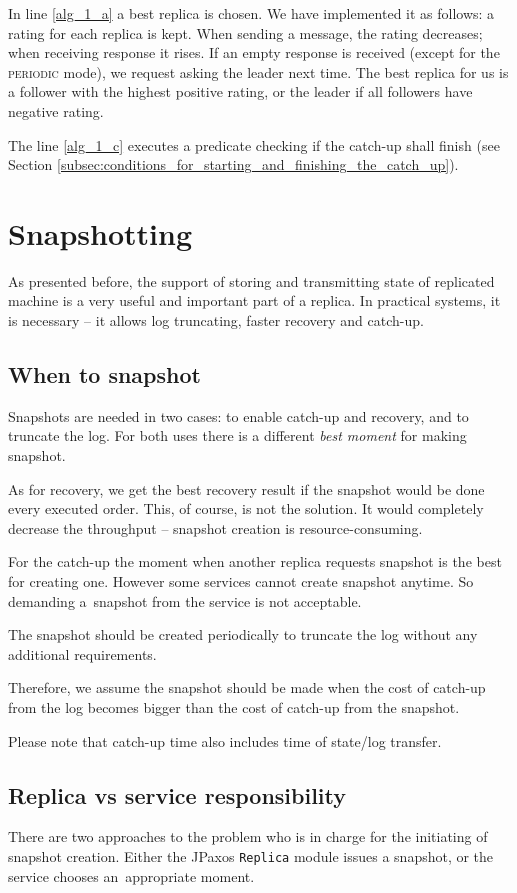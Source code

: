In line \ref{alg_1_a} a best replica is chosen. We have implemented it as follows: a rating for each replica is kept. When sending a message, the rating decreases; when receiving response it rises. If an empty response is received (except for the \textsc{periodic} mode), we request asking the leader next time. The best replica for us is a follower with the highest positive rating, or the leader if all followers have negative rating.

The line \ref{alg_1_c} executes a predicate checking if the catch-up shall finish (see Section \ref{subsec:conditions_for_starting_and_finishing_the_catch_up}).

\section{Snapshotting}
\label{sec:snapshotting}
As presented before, the support of storing and transmitting state of replicated machine is a very useful and important part of a replica. In practical systems, it is necessary -- it allows log truncating, faster recovery and catch-up.

\subsection{When to snapshot}
\label{subsec:when_to_snapshot}
Snapshots are needed in two cases: to enable catch-up and recovery, and to truncate the log. For both uses there is a different \textit{best moment} for making snapshot.

As for recovery, we get the best recovery result if the snapshot would be done every executed order.
This, of course, is not the solution. It would completely decrease the throughput -- snapshot creation is resource-consuming.

For the catch-up the moment when another replica requests snapshot is the best for creating one. 
However some services cannot create snapshot anytime. So demanding a~snapshot from the service is not acceptable.

The snapshot should be created periodically to truncate the log without any additional requirements.

Therefore, we assume the snapshot should be made when the cost of catch-up from the log becomes bigger than the cost of catch-up from the snapshot.

Please note that catch-up time also includes time of state/log transfer.

\subsection{Replica vs service responsibility}
\label{subsec:replica_vs_state_machine_responsibility}
There are two approaches to the problem who is in charge for the initiating of snapshot creation. Either the JPaxos \texttt{Replica} module issues a snapshot, or the service chooses an~appropriate moment.

